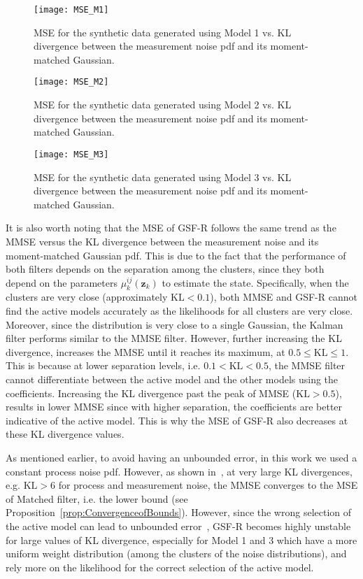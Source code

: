 \documentclass[10pt,twocolumn,twoside]{IEEEtran}
\newcommand{\corcol}[1]{\textcolor{CorCol}{#1}}
\begin{document}
\begin{figure}[!t]
\centering
\texttt{[image: MSE\_M1]}
\caption{MSE for the synthetic data generated using Model 1 vs. KL divergence between the measurement noise pdf and its moment-matched Gaussian.}
\label{fig:MSEM1}
\end{figure}
\begin{figure}[!t]
\centering
\texttt{[image: MSE\_M2]}
\caption{MSE for the synthetic data generated using Model 2 vs. KL divergence between the measurement noise pdf and its moment-matched Gaussian.}
\label{fig:MSEM2}
\end{figure}
\begin{figure}[!t]
\centering
\texttt{[image: MSE\_M3]}
\caption{MSE for the synthetic data generated using Model 3 vs. KL divergence between the measurement noise pdf and its moment-matched Gaussian.}
\label{fig:MSEM3}
\end{figure}

It is also worth noting that the MSE of GSF-R follows the same trend as the MMSE versus the KL divergence between the measurement noise and its moment-matched Gaussian pdf. This is due to the fact that the performance of both filters depends on the separation among the clusters, since they both depend on the parameters \(\mu_k^{ij}{\left(\mathbf{z}_{k}\right)}\) to estimate the state. Specifically, when the clusters are very close (approximately \(\mathrm{KL}<0.1\)), both MMSE and GSF-R cannot find the active models accurately as the likelihoods for all clusters are very close. Moreover, since the distribution is very close to a single Gaussian, \corcol{the }Kalman filter performs similar to the MMSE filter. However, further increasing the KL divergence, increases the MMSE until it reaches its maximum, at \corcol{\( 0.5 \leq \mathrm{KL} \leq 1\)}. This is because at lower separation levels, i.e. \(0.1 < \mathrm{KL} < 0.5\), the MMSE filter cannot differentiate between the active model and the other models using the coefficients. Increasing the KL divergence past the peak of MMSE (\(\mathrm{KL}> 0.5\)), results in lower MMSE since with higher separation, the coefficients are better indicative of the active model. This is why the MSE of GSF-R also decreases at these KL divergence values.

As mentioned earlier, to avoid having an unbounded error, in this work we used a constant process noise pdf. However, as shown in~\cite{pishdad_approximate_2014}, at very large KL divergences, e.g. \(\mathrm{KL}> 6\) for process and measurement noise, the MMSE converges to the MSE of Matched filter, i.e. the lower bound (see Proposition~\ref{prop:ConvergenceofBounds}). However, since the wrong selection of the active model can lead to unbounded error~\cite{bar2001estimation}, GSF-R becomes highly unstable for large values of KL divergence, especially for Model 1 and 3 which have a more uniform weight distribution (among the clusters of the noise distributions), and rely more on the likelihood for the correct selection of the active model.
\end{document}
